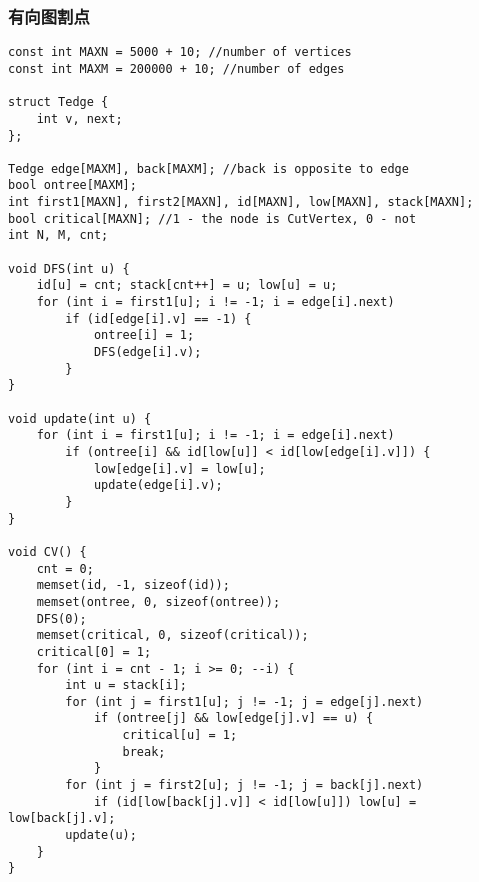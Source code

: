 \subsubsection{有向图割点}
\begin{verbatim}
const int MAXN = 5000 + 10; //number of vertices
const int MAXM = 200000 + 10; //number of edges

struct Tedge {
    int v, next;
};

Tedge edge[MAXM], back[MAXM]; //back is opposite to edge
bool ontree[MAXM];
int first1[MAXN], first2[MAXN], id[MAXN], low[MAXN], stack[MAXN];
bool critical[MAXN]; //1 - the node is CutVertex, 0 - not
int N, M, cnt;

void DFS(int u) {
    id[u] = cnt; stack[cnt++] = u; low[u] = u;
    for (int i = first1[u]; i != -1; i = edge[i].next)
        if (id[edge[i].v] == -1) {
            ontree[i] = 1;
            DFS(edge[i].v);
        }
}

void update(int u) {
    for (int i = first1[u]; i != -1; i = edge[i].next)
        if (ontree[i] && id[low[u]] < id[low[edge[i].v]]) {
            low[edge[i].v] = low[u];
            update(edge[i].v);
        }
}

void CV() {
    cnt = 0;
    memset(id, -1, sizeof(id));
    memset(ontree, 0, sizeof(ontree));
    DFS(0);
    memset(critical, 0, sizeof(critical));
    critical[0] = 1;
    for (int i = cnt - 1; i >= 0; --i) {
        int u = stack[i];
        for (int j = first1[u]; j != -1; j = edge[j].next)
            if (ontree[j] && low[edge[j].v] == u) {
                critical[u] = 1;
                break;
            }
        for (int j = first2[u]; j != -1; j = back[j].next)
            if (id[low[back[j].v]] < id[low[u]]) low[u] = low[back[j].v];
        update(u);
    }
}
\end{verbatim}
